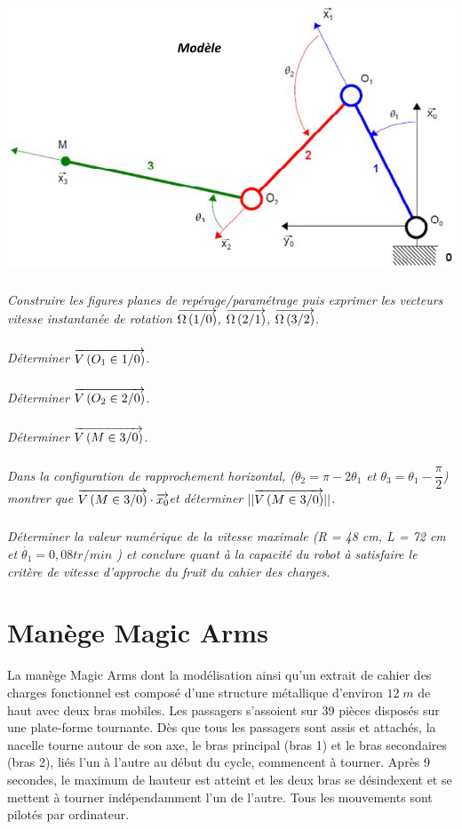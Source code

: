 \documentclass[10pt,oneside]{article}
\begin{document}
\begin{center}
\includegraphics[width=.5\textwidth]{png/fig3}
\end{center}

\subparagraph{}
\textit{Construire les figures planes de repérage/paramétrage puis exprimer les vecteurs vitesse instantanée de rotation $\overrightarrow{\Omega\left( {1}/{0}\right)}$, $\overrightarrow{\Omega\left( {2}/{1}\right)}$, $\overrightarrow{\Omega\left( {3}/{2}\right)}$.} 

\subparagraph{}
\textit{Déterminer $\overrightarrow{V\left( {O_1} \in {1}/{0}\right)}$.}

\subparagraph{}
\textit{Déterminer $\overrightarrow{V\left( {O_2} \in {2}/{0}\right)}$.}

\subparagraph{}
\textit{Déterminer $\overrightarrow{V\left( {M} \in {3}/{0}\right)}$.}

\subparagraph{}
\textit{Dans la configuration de rapprochement horizontal, ($\theta_2=\pi-2\theta_1$ et $\theta_3=\theta_1-\dfrac{\pi}{2}$) montrer que $\overrightarrow{V\left( {M} \in {3}/{0}\right)}\cdot \overrightarrow{x_0}$et déterminer $||\overrightarrow{V\left( {M} \in {3}/{0}\right)}||$.}

\subparagraph{}
\textit{Déterminer la valeur numérique de la vitesse maximale (R = 48 cm, L = 72 cm et $\dot{\theta_1}= 0,08 tr/min$ ) et conclure quant à la capacité du robot à satisfaire le critère de vitesse d'approche du fruit du cahier des charges. }

\section*{Manège Magic Arms } 
\setcounter{subparagraph}{0}

La manège Magic Arms dont la modélisation ainsi qu'un extrait de cahier des charges fonctionnel est composé d'une structure métallique d'environ $12\; m$ de haut avec deux bras mobiles. Les passagers s'assoient sur 39 pièces disposés sur une plate-forme tournante. Dès que tous les passagers sont assis et attachés, la nacelle tourne autour de son axe, le bras principal (bras 1) et le bras secondaires (bras 2), liés l'un à l'autre au début du cycle, commencent à tourner. Après 9 secondes, le maximum de hauteur est atteint et les deux bras se désindexent et se mettent à tourner indépendamment l'un de l'autre. Tous les mouvements sont pilotés par ordinateur. 
\end{document}
